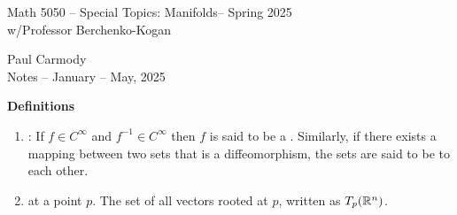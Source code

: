 \documentclass[10pt,a4paper]{report}
\newcommand{\CLASSNAME}{Math 5050 -- Special Topics: Manifolds}
\newcommand{\STUDENTNAME}{Paul Carmody}
\newcommand{\ASSIGNMENT}{Notes }
\newcommand{\DUEDATE}{January -- May, 2025}
\newcommand{\SEMESTER}{Spring 2025}
\begin{document}
\begin{center}
	\Large{\CLASSNAME -- \SEMESTER} \\
	\large{ w/Professor Berchenko-Kogan}
\end{center}
\begin{center}
	\STUDENTNAME \\
	\ASSIGNMENT -- \DUEDATE\\
\end{center} 

\noindent \textbf{Definitions}

\begin{enumerate}
	\item {}: If $f \in C^\infty$ and $f^{-1} \in C^\infty$ then $f$ is said to be a .  Similarly, if there exists a mapping between two sets that is a diffeomorphism, the sets are said to be  to each other.
	\item {} at a point $p$.  The set of all vectors rooted at $p$, written as $T_p(\mathbb{R}^n)$.  
	

\end{enumerate}
\end{document}
